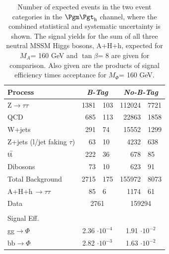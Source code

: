 \begin{table}[!h]
  \begin{center}
    \caption{Number of expected events in the two event categories in the $\Pgm\Pgt_{\rm h}$ channel, where the combined statistical and systematic uncertainty is shown. 
      The signal yields for the sum of all three neutral MSSM Higgs bosons, A+H+h, expected for $M_{A}$= 160 GeV and $\tan\beta$= 8 are given for comparison.
      Also given are the products of signal efficiency times acceptance for $M_{\Phi}$= 160 GeV.}
\begin{tabular}{|l|r@{$ \,\,\pm\,\, $}l|r@{$ \,\,\pm\,\, $}l|} 
\hline 
Process & \multicolumn{2}{c|}{\emph{B-Tag}} & \multicolumn{2}{c|}{\emph{No-B-Tag}}\\ 
\hline 
Z$\rightarrow \tau\tau$          &       1381    &       103     &       112024  &       7721    \\ 
\hline 
QCD                              &       685     &       113     &       22863   &       1858    \\ 
\hline 
W+jets                           &       291     &       74      &       15552   &       1299    \\ 
\hline 
Z+jets (l/jet faking $\tau$)     &       63      &       10      &       4232    &       638     \\ 
\hline 
t$\bar{\rm{t}}$                  &       222     &       36      &       678     &       85      \\ 
\hline 
Dibosons                         &       73      &       10      &       623     &       91      \\ 
\hline 
\hline 
Total Background                 &       2715    &       175     &       155972  &       8073    \\ 
\hline 
A+H+h\,$\rightarrow\tau\tau$           &       85      &       6     &       1174     &       61      \\ 
\hline 
Data                             & \multicolumn{2}{|c|}{2761}    & \multicolumn{2}{|c|}{159294}  \\ 
\hline 
\multicolumn{5}{c}{ } \\
\multicolumn{2}{l}{Signal Eff.} &  \multicolumn{3}{c}{ } \\
\hline
gg$\rightarrow\Phi$                &       \multicolumn{2}{|c|}{2.36 $\cdot 10^{-4}$}      &       \multicolumn{2}{|c|}{1.91 $\cdot 10^{-2}$}\\ 
\hline 
bb$\rightarrow\Phi$                &       \multicolumn{2}{|c|}{2.82 $\cdot 10^{-3}$}      &       \multicolumn{2}{|c|}{1.63 $\cdot 10^{-2}$}\\ 
\hline 
\end{tabular} 
\label{table:events_mutau} 
\end{center} 
\end{table} 

